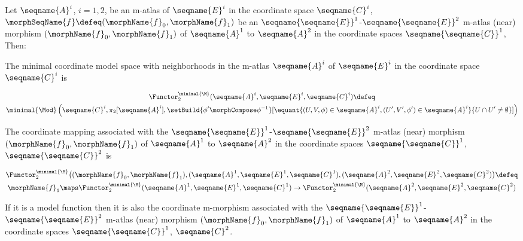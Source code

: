\documentclass{article}
\begin{document}
\begin{definition}
\label{def:M-modC}
Let $\seqname{A}^i$, $i=1,2$, be an m-atlas of $\seqname{E}^i$ in
the coordinate space $\seqname{C}^i$,
$\morphSeqName{f} \defeq (\morphName{f}_0,\morphName{f}_1)$ be an
$\seqname{\seqname{E}}^1$-$\seqname{\seqname{E}}^2$ m-atlas (near)
morphism $(\morphName{f}_0,\morphName{f}_1)$ of $\seqname{A}^1$ to
$\seqname{A}^2$ in the coordinate spaces $\seqname{\seqname{C}}^1$, Then:

The minimal coordinate model space with neighborhoods in the m-atlas
$\seqname{A}^i$ of $\seqname{E}^i$ in the coordinate space
$\seqname{C}^i$ is

\begin{multline}
\Functor^{\minimal{\M}}_2 (\seqname{A}^i, \seqname{E}^i, \seqname{C}^i)
\defeq \\
\minimal{\Mod}
  \left (
    \seqname{C}^i,
    \pi_2[\seqname{A}^i],
    \setBuild
      {\phi' \morphCompose \phi^{-1}}%
      [
        \equant
          {
            {(U,V,\phi) \in \seqname{A}^i},
            {(U',V',\phi') \in \seqname{A}^i}
          }
          {
            U \cap U' \ne \emptyset
          }
      ]
  \right )
\end{multline}

The coordinate mapping associated with the
$\seqname{\seqname{E}}^1$-$\seqname{\seqname{E}}^2$ m-atlas (near)
morphism $(\morphName{f}_0,\morphName{f}_1)$ of $\seqname{A}^1$ to
$\seqname{A}^2$ in the coordinate spaces $\seqname{\seqname{C}}^1$,
$\seqname{\seqname{C}}^2$ is

\begin{multline}
\Functor^{\minimal{\M}}_2
  \bigl (
    (
      \morphName{f}_0,
      \morphName{f}_1
    ),
    (\seqname{A}^1, \seqname{E}^1, \seqname{C}^1),
    (\seqname{A}^2, \seqname{E}^2, \seqname{C}^2)
  \bigr )
\defeq \\
  \morphName{f}_1
  \maps
  \Functor^{\minimal{\M}}_2 (\seqname{A}^1, \seqname{E}^1, \seqname{C}^1)
  \to
  \Functor^{\minimal{\M}}_2 (\seqname{A}^2, \seqname{E}^2, \seqname{C}^2)
\end{multline}

If it is a model function then it is also the coordinate m-morphism
associated with the $\seqname{\seqname{E}}^1$-$\seqname{\seqname{E}}^2$
m-atlas (near) morphism $(\morphName{f}_0,\morphName{f}_1)$ of
$\seqname{A}^1$ to $\seqname{A}^2$ in the coordinate spaces
$\seqname{\seqname{C}}^1$, $\seqname{C}^2$.

\end{definition}
\end{document}
